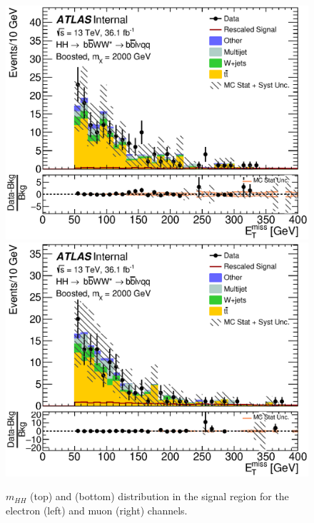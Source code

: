 \begin{figure}[h]
\begin{center}
\includegraphics[scale=0.33]{figures/kinplots/new/C_2tag_SR_elec_presel_met50_MET}
\includegraphics[scale=0.33]{figures/kinplots/new/C_2tag_SR_muon_presel_met50_MET}\\
\caption[Kinematic distributions in the signal region for the electron and muon channels]{$m_{HH}$ (top) and \met (bottom) distribution in the signal region for the electron (left) and muon (right) channels.}
\end{center}
\end{figure}